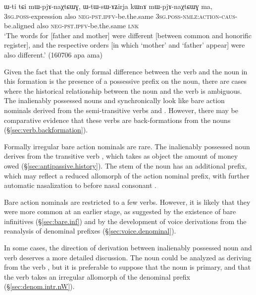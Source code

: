 \begin{exe}
\ex \label{ex:Wti.WtWsAZirja}
\gll  ɯ-ti tɕi mɯ-pjɤ-naχtɕɯɣ, ɯ-tɯ-sɯ-ɤʑirja kɯnɤ mɯ-pjɤ-naχtɕɯɣ ma, \\
\textsc{3sg}.\textsc{poss}-expression also \textsc{neg}-\textsc{pst}.\textsc{ipfv}-be.the.same \textsc{3sg}.\textsc{poss}-\textsc{nmlz}:\textsc{action}-\textsc{caus}-be.aligned also \textsc{neg}-\textsc{pst}.\textsc{ipfv}-be.the.same \textsc{lnk} \\
\glt `The words for [father and mother] were different [between common and honorific register], and the respective orders [in which `mother' and `father' appear] were also different.'  (160706 apa ama)	
\end{exe}

Given the fact that the only formal difference between the verb and the noun in this formation is the presence of a possessive prefix on the noun, there are cases where the historical relationship between the noun and the verb is ambiguous. The inalienably possessed nouns  and  synchronically look like bare action nominals derived from the semi-transitive verbs  and . However, there may be comparative evidence that these verbs are back-formations from the nouns (§\ref{sec:verb.backformation}).

Formally irregular bare action nominals are rare. The inalienably possessed noun  derives from the transitive verb , which takes as object the amount of money owed (§\ref{sec:antipassive.history}). The stem of the noun has an additional  prefix, which may reflect a reduced allomorph  of the  action nominal prefix, with further automatic nasalization to  before nasal consonant \citep{jacques14antipassive}.

Bare action nominals are restricted to a few verbs. However, it is likely that they were more common at an earlier stage, as suggested by the existence of bare infinitives (§\ref{sec:bare.inf}) and by the development of voice derivations from the reanalysis of denominal prefixes (§\ref{sec:voice.denominal}).

In some cases, the direction of derivation between inalienably possessed noun and verb deserves a more detailed discussion. The noun  could be analyzed as deriving from the verb , but it is preferable to suppose that the noun is primary, and that the verb takes an irregular allomorph of the denominal  prefix (§\ref{sec:denom.intr.nW}).



